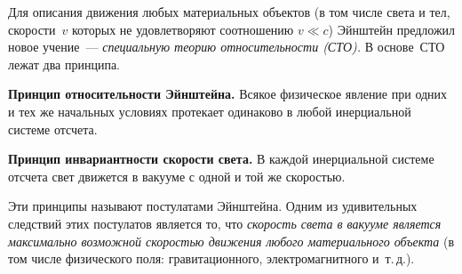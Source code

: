 \documentclass[main.tex]{subfiles}
\begin{document}
Для описания движения любых материальных объектов (в том числе света и тел, скорости~$v$ которых не удовлетворяют соотношению $v\ll c$) Эйнштейн предложил новое учение~--- \emph{специальную теорию относительности (СТО).} В основе~СТО лежат два принципа. 
%
\begin{law}
    \textbf{Принцип относительности Эйнштейна.} Всякое физическое явление при одних и тех же начальных условиях протекает одинаково в любой инерциальной системе отсчета.
\end{law}
%
\begin{law}
    \textbf{Принцип инвариантности скорости света.} В каждой инерциальной системе отсчета свет движется в вакууме с одной и той же скоростью.
\end{law}
%
Эти принципы называют постулатами Эйнштейна. Одним из удивительных следствий этих постулатов является то, что \emph{скорость света в вакууме является максимально возможной скоростью движения любого материального объекта} (в том числе физического поля: гравитационного, электромагнитного и~т.\,д.).
\end{document}
